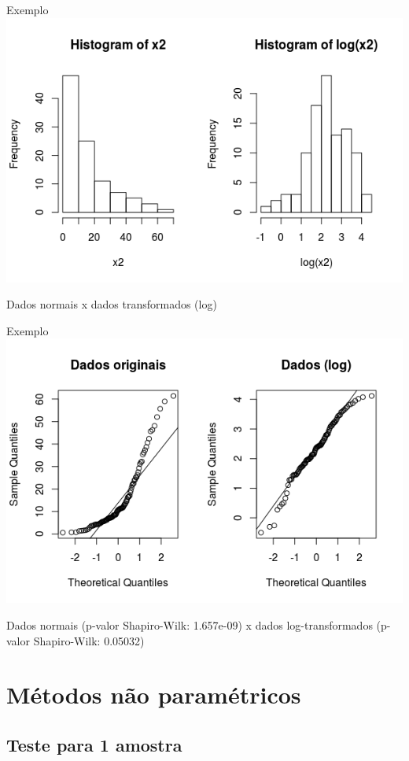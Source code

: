 \documentclass{beamer}
\begin{document}
\begin{frame}{Exemplo}
  \centering
  \includegraphics[width=\textwidth]{Cap37-38/transf-h}

Dados normais x dados transformados (log)
\end{frame}

\begin{frame}{Exemplo}
  \centering
  \includegraphics[width=\textwidth]{Cap37-38/transf-qq}

Dados normais (p-valor Shapiro-Wilk: 1.657e-09) x dados log-transformados (p-valor Shapiro-Wilk: 0.05032)
\end{frame}

\section{Métodos não paramétricos}

\subsection[1 amostra]{Teste para 1 amostra}
\end{document}
